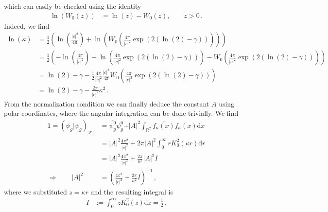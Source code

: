 which can easily be checked using the identity
\begin{align*}
  \ln(W_{0}(z))
  &=
  \ln(z)
  -
  W_{0}(z)
  ,\qquad
  z > 0
  \,.
\end{align*}
Indeed, we find
\begin{align*}
  \ln(\kappa)
  &=
  \frac{1}{2}
  \left(
    \ln
    \left(
      \frac{\vert c \vert^{2}}{4\pi}
    \right)
    +
    \ln
    \left(
      W_{0}
      \left(
        \frac{4\pi}{\vert c \vert^{2}}
        \exp(2(\ln(2) - \gamma))
      \right)
    \right)
  \right)
  \\
  &=
  \frac{1}{2}
  \left(
    -
    \ln
    \left(
      \frac{4\pi}{\vert c \vert^{2}}
    \right)
    +
    \ln
    \left(
      \frac{4\pi}{\vert c \vert^{2}}
      \exp(2(\ln(2) - \gamma))
    \right)
    -
    W_{0}
    \left(
      \frac{4\pi}{\vert c \vert^{2}}
      \exp(2(\ln(2) - \gamma))
    \right)
  \right)
  \\
  &=
  \ln(2)
  -
  \gamma
  -
  \frac{1}{2}
  \frac{4\pi}{\vert c \vert^{2}}
  \frac{\vert c \vert^{2}}{4\pi}
  W_{0}
  \left(
    \frac{4\pi}{\vert c \vert^{2}}
    \exp(2(\ln(2) - \gamma))
  \right)
  \\
  &=
  \ln(2)
  -
  \gamma
  -
  \frac{2\pi}{\vert c \vert^{2}}
  \kappa^{2}
  \,.
\end{align*}
From the normalization condition we can finally deduce the constant $A$ using polar coordinates, where the angular integration can be done trivially. We find
\begin{align*}
  1
  =
  \left(
    \psi_{g}
    \vert
    \psi_{g}
  \right)_{\mathcal{F}_{1}}
  &=
  \overline{\psi_{g}^{0}}
  \psi_{g}^{0}
  +
  \vert A \vert^{2}
  \int_{\mathbb{R}^{2}}
  \overline{f_{\kappa}(x)}
  f_{\kappa}(x)
  \mathrm{d}x
  \\
  &=
  \vert A \vert^{2}
  \frac{4\pi^{2}}{\vert c \vert^{2}}
  +
  2\pi
  \vert A \vert^{2}
  \int_{0}^{\infty}
  r
  K_{0}^{2}(\kappa r)
  \mathrm{d}r
  \\
  &=
  \vert A \vert^{2}
  \frac{4\pi^{2}}{\vert c \vert^{2}}
  +
  \frac{2\pi}{\kappa^{2}}
  \vert A \vert^{2}
  I
  \\
  \Rightarrow
  \qquad
  \vert A \vert^{2}
  &=
  \left(
    \frac{4\pi^{2}}{\vert c \vert^{2}}
    +
    \frac{2\pi}{\kappa^{2}}
    I
  \right)^{-1}
  \,,
\end{align*}
where we substituted $z = \kappa r$ and the resulting integral is
\begin{align*}
  I
  &:=
  \int_{0}^{\infty}
  z
  K_{0}^{2}(z)
  \mathrm{d}z
  =
  \frac{1}{2}
  \,.
\end{align*}
